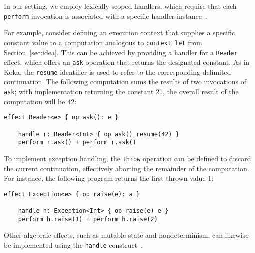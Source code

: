 \documentclass[acmsmall,review,screen]{acmart}
\newcommand{\ap}{~}
\newcommand{\keyword}[1]{\mathbf{#1}}
\begin{document}
In our setting, we employ lexically scoped handlers, which require that each \lstinline[language=colang]{perform} invocation is associated with a specific handler instance~\cite{biernacki2019binders, brachthauser2020effects}.

For example, consider defining an execution context that supplies a specific constant value to a computation analogous to \lstinline[language=colang]{context let} from Section~\ref{sec:idea}.
This can be achieved by providing a handler for a \lstinline[language=colang]{Reader} effect, which offers an \lstinline[language=colang]{ask} operation that returns the designated constant.
As in Koka, the \lstinline[language=colang]{resume} identifier is used to refer to the corresponding delimited continuation.
The following computation sums the results of two invocations of \lstinline[language=colang]{ask}; with implementation returning the constant 21, the overall result of the computation will be 42:
\begin{lstlisting}[language=colang]
    effect Reader<e> { op ask(): e }

    handle r: Reader<Int> { op ask() resume(42) }
    perform r.ask() + perform r.ask()
\end{lstlisting}

To implement exception handling, the \texttt{throw} operation can be defined to discard the current continuation, effectively aborting the remainder of the computation.
For instance, the following program returns the first thrown value 1:
\begin{lstlisting}[language=colang]
    effect Exception<e> { op raise(e): a }

    handle h: Exception<Int> { op raise(e) e }
    perform h.raise(1) + perform h.raise(2)
\end{lstlisting}

Other algebraic effects, such as mutable state and nondeterminism, can likewise be implemented using the \texttt{handle} construct~\cite{plotkin2013handling}.

\end{document}
